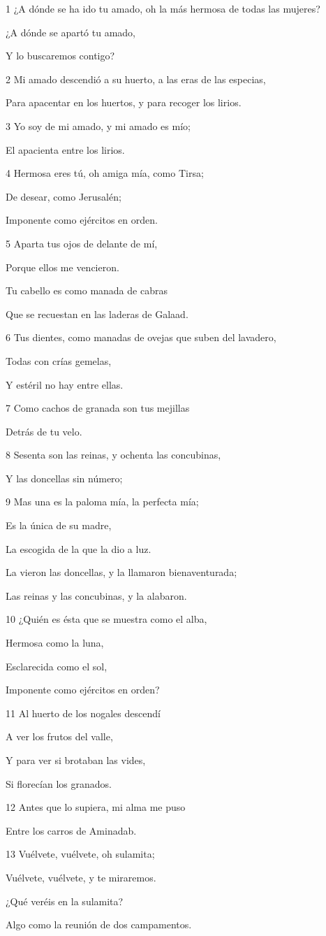 \par 1 ¿A dónde se ha ido tu amado, oh la más hermosa de todas las mujeres?
\par ¿A dónde se apartó tu amado,
\par Y lo buscaremos contigo?
\par 2 Mi amado descendió a su huerto, a las eras de las especias,
\par Para apacentar en los huertos, y para recoger los lirios.
\par 3 Yo soy de mi amado, y mi amado es mío;
\par El apacienta entre los lirios.
\par 4 Hermosa eres tú, oh amiga mía, como Tirsa;
\par De desear, como Jerusalén;
\par Imponente como ejércitos en orden.
\par 5 Aparta tus ojos de delante de mí,
\par Porque ellos me vencieron.
\par Tu cabello es como manada de cabras
\par Que se recuestan en las laderas de Galaad.
\par 6 Tus dientes, como manadas de ovejas que suben del lavadero,
\par Todas con crías gemelas,
\par Y estéril no hay entre ellas.
\par 7 Como cachos de granada son tus mejillas
\par Detrás de tu velo.
\par 8 Sesenta son las reinas, y ochenta las concubinas,
\par Y las doncellas sin número;
\par 9 Mas una es la paloma mía, la perfecta mía;
\par Es la única de su madre,
\par La escogida de la que la dio a luz.
\par La vieron las doncellas, y la llamaron bienaventurada;
\par Las reinas y las concubinas, y la alabaron.
\par 10 ¿Quién es ésta que se muestra como el alba,
\par Hermosa como la luna,
\par Esclarecida como el sol,
\par Imponente como ejércitos en orden?
\par 11 Al huerto de los nogales descendí
\par A ver los frutos del valle,
\par Y para ver si brotaban las vides,
\par Si florecían los granados.
\par 12 Antes que lo supiera, mi alma me puso
\par Entre los carros de Aminadab.
\par 13 Vuélvete, vuélvete, oh sulamita;
\par Vuélvete, vuélvete, y te miraremos.
\par ¿Qué veréis en la sulamita?
\par Algo como la reunión de dos campamentos.

